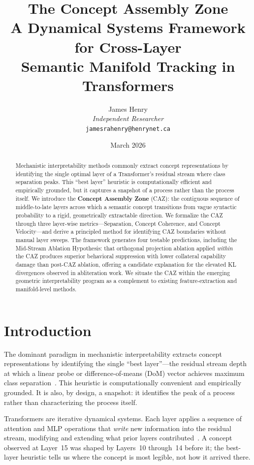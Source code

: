 \documentclass[11pt,a4paper]{article}
\title{\textbf{The Concept Assembly Zone}\\
\large A Dynamical Systems Framework for Cross-Layer\\
Semantic Manifold Tracking in Transformers}
\author{
  James Henry \\
  \textit{Independent Researcher} \\
  \texttt{jamesrahenry@henrynet.ca}
}
\date{March 2026}
\begin{document}
\maketitle
\thispagestyle{empty}

\begin{abstract}
	Mechanistic interpretability methods commonly extract concept representations by
	identifying the single optimal layer of a Transformer's residual stream where class
	separation peaks. This ``best layer'' heuristic is computationally efficient and
	empirically grounded, but it captures a snapshot of a process rather than the process
	itself. We introduce the \textbf{Concept Assembly Zone} (CAZ): the contiguous sequence
	of middle-to-late layers across which a semantic concept transitions from vague syntactic
	probability to a rigid, geometrically extractable direction. We formalize the CAZ
	through three layer-wise metrics---Separation, Concept Coherence, and Concept
	Velocity---and derive a principled method for identifying CAZ boundaries without
	manual layer sweeps. The framework generates four testable predictions, including
	the Mid-Stream Ablation Hypothesis: that orthogonal projection ablation applied
	\emph{within} the CAZ produces superior behavioral suppression with lower collateral
	capability damage than post-CAZ ablation, offering a candidate explanation for the
	elevated KL divergences observed in abliteration work. We situate the CAZ within the
	emerging geometric interpretability program as a complement to existing feature-extraction
	and manifold-level methods.
\end{abstract}

\section{Introduction}
\label{sec:intro}

The dominant paradigm in mechanistic interpretability extracts concept representations
by identifying the single ``best layer''---the residual stream depth at which a
linear probe or difference-of-means (DoM) vector achieves maximum class
separation~\citep{zou2023representation, arditi2024refusal}. This heuristic is
computationally convenient and empirically grounded. It is also, by design, a
snapshot: it identifies the peak of a process rather than characterizing the process
itself.

Transformers are iterative dynamical systems. Each layer applies a sequence of
attention and MLP operations that \emph{write} new information into the residual
stream, modifying and extending what prior layers contributed~\citep{elhage2021mathematical}.
A concept observed at Layer~15 was shaped by Layers~10 through~14 before it;
the best-layer heuristic tells us where the concept is most legible, not how it
arrived there.
\end{document}
